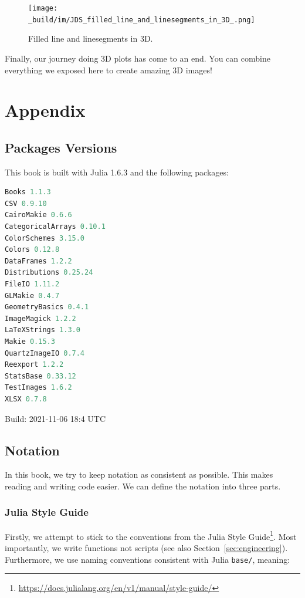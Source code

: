 \documentclass[
  notoc %
]{tufte-book}
\DeclareRobustCommand{\href}[2]{#2\footnote{\url{#1}}}
\newcommand{\passthrough}[1]{#1}
\begin{document}
\begin{figure}
\hypertarget{fig:filled_line_and_linesegments_in_3D}{%
\centering
\texttt{[image: \_build/im/JDS\_filled\_line\_and\_linesegments\_in\_3D\_.png]}
\caption{Filled line and linesegments in
3D.}\label{fig:filled_line_and_linesegments_in_3D}
}
\end{figure}

Finally, our journey doing 3D plots has come to an end. You can combine
everything we exposed here to create amazing 3D images!

\hypertarget{sec:appendix}{%
\chapter{Appendix}\label{sec:appendix}}

\hypertarget{sec:appendix_pkg}{%
\section{Packages Versions}\label{sec:appendix_pkg}}

This book is built with Julia 1.6.3 and the following packages:

\begin{lstlisting}[language=Julia]
Books 1.1.3
CSV 0.9.10
CairoMakie 0.6.6
CategoricalArrays 0.10.1
ColorSchemes 3.15.0
Colors 0.12.8
DataFrames 1.2.2
Distributions 0.25.24
FileIO 1.11.2
GLMakie 0.4.7
GeometryBasics 0.4.1
ImageMagick 1.2.2
LaTeXStrings 1.3.0
Makie 0.15.3
QuartzImageIO 0.7.4
Reexport 1.2.2
StatsBase 0.33.12
TestImages 1.6.2
XLSX 0.7.8
\end{lstlisting}

Build: 2021-11-06 18:4 UTC

\hypertarget{sec:notation}{%
\section{Notation}\label{sec:notation}}

In this book, we try to keep notation as consistent as possible. This
makes reading and writing code easier. We can define the notation into
three parts.

\hypertarget{julia-style-guide}{%
\subsection{Julia Style Guide}\label{julia-style-guide}}

Firstly, we attempt to stick to the conventions from the
\href{https://docs.julialang.org/en/v1/manual/style-guide/}{Julia Style
Guide}. Most importantly, we write functions not scripts (see also
Section~\ref{sec:engineering}). Furthermore, we use naming conventions
consistent with Julia \passthrough{\lstinline!base/!}, meaning:
\end{document}
